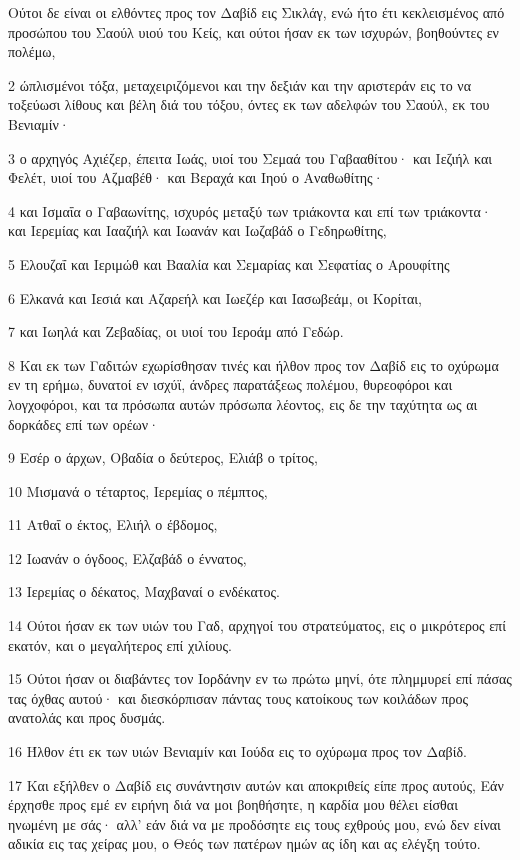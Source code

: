 \par Ούτοι δε είναι οι ελθόντες προς τον Δαβίδ εις Σικλάγ, ενώ ήτο έτι κεκλεισμένος από προσώπου του Σαούλ υιού του Κείς, και ούτοι ήσαν εκ των ισχυρών, βοηθούντες εν πολέμω,
\par 2 ώπλισμένοι τόξα, μεταχειριζόμενοι και την δεξιάν και την αριστεράν εις το να τοξεύωσι λίθους και βέλη διά του τόξου, όντες εκ των αδελφών του Σαούλ, εκ του Βενιαμίν·
\par 3 ο αρχηγός Αχιέζερ, έπειτα Ιωάς, υιοί του Σεμαά του Γαβααθίτου· και Ιεζιήλ και Φελέτ, υιοί του Αζμαβέθ· και Βεραχά και Ιηού ο Αναθωθίτης·
\par 4 και Ισμαΐα ο Γαβαωνίτης, ισχυρός μεταξύ των τριάκοντα και επί των τριάκοντα· και Ιερεμίας και Ιααζιήλ και Ιωανάν και Ιωζαβάδ ο Γεδηρωθίτης,
\par 5 Ελουζαΐ και Ιεριμώθ και Βααλία και Σεμαρίας και Σεφατίας ο Αρουφίτης
\par 6 Ελκανά και Ιεσιά και Αζαρεήλ και Ιωεζέρ και Ιασωβεάμ, οι Κορίται,
\par 7 και Ιωηλά και Ζεβαδίας, οι υιοί του Ιεροάμ από Γεδώρ.
\par 8 Και εκ των Γαδιτών εχωρίσθησαν τινές και ήλθον προς τον Δαβίδ εις το οχύρωμα εν τη ερήμω, δυνατοί εν ισχύϊ, άνδρες παρατάξεως πολέμου, θυρεοφόροι και λογχοφόροι, και τα πρόσωπα αυτών πρόσωπα λέοντος, εις δε την ταχύτητα ως αι δορκάδες επί των ορέων·
\par 9 Εσέρ ο άρχων, Οβαδία ο δεύτερος, Ελιάβ ο τρίτος,
\par 10 Μισμανά ο τέταρτος, Ιερεμίας ο πέμπτος,
\par 11 Ατθαΐ ο έκτος, Ελιήλ ο έβδομος,
\par 12 Ιωανάν ο όγδοος, Ελζαβάδ ο έννατος,
\par 13 Ιερεμίας ο δέκατος, Μαχβαναί ο ενδέκατος.
\par 14 Ούτοι ήσαν εκ των υιών του Γαδ, αρχηγοί του στρατεύματος, εις ο μικρότερος επί εκατόν, και ο μεγαλήτερος επί χιλίους.
\par 15 Ούτοι ήσαν οι διαβάντες τον Ιορδάνην εν τω πρώτω μηνί, ότε πλημμυρεί επί πάσας τας όχθας αυτού· και διεσκόρπισαν πάντας τους κατοίκους των κοιλάδων προς ανατολάς και προς δυσμάς.
\par 16 Ήλθον έτι εκ των υιών Βενιαμίν και Ιούδα εις το οχύρωμα προς τον Δαβίδ.
\par 17 Και εξήλθεν ο Δαβίδ εις συνάντησιν αυτών και αποκριθείς είπε προς αυτούς, Εάν έρχησθε προς εμέ εν ειρήνη διά να μοι βοηθήσητε, η καρδία μου θέλει είσθαι ηνωμένη με σάς· αλλ' εάν διά να με προδόσητε εις τους εχθρούς μου, ενώ δεν είναι αδικία εις τας χείρας μου, ο Θεός των πατέρων ημών ας ίδη και ας ελέγξη τούτο.
